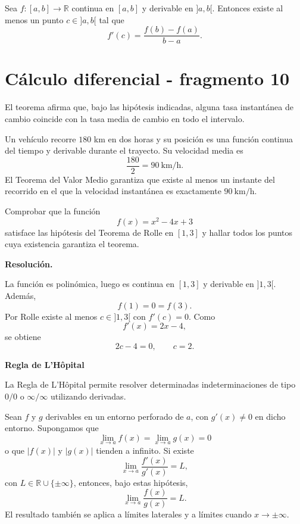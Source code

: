 \begin{theorem}
Sea $f:[a,b]\to\mathbb{R}$ continua en $[a,b]$ y derivable en $]a,b[$. Entonces existe al menos un punto $c\in]a,b[$ tal que
\[
f'(c)=\frac{f(b)-f(a)}{b-a}.
\]
\end{theorem}


\section{Cálculo diferencial - fragmento 10}
El teorema afirma que, bajo las hipótesis indicadas, alguna tasa instantánea de cambio coincide con la tasa media de cambio en todo el intervalo.

\begin{example}
Un vehículo recorre $180$ km en dos horas y su posición es una función continua del tiempo y derivable durante el trayecto. Su velocidad media es
\[
\frac{180}{2}=90\ \mathrm{km/h}.
\]
El Teorema del Valor Medio garantiza que existe al menos un instante del recorrido en el que la velocidad instantánea es exactamente $90\ \mathrm{km/h}$.
\end{example}

\begin{solvedexercise}
Comprobar que la función
\[
f(x)=x^2-4x+3
\]
satisface las hipótesis del Teorema de Rolle en $[1,3]$ y hallar todos los puntos cuya existencia garantiza el teorema.

\textbf{Resolución.}\par\smallskip
La función es polinómica, luego es continua en $[1,3]$ y derivable en $]1,3[$. Además,
\[
f(1)=0=f(3).
\]
Por Rolle existe al menos $c\in]1,3[$ con $f'(c)=0$. Como
\[
f'(x)=2x-4,
\]
se obtiene
\[
2c-4=0,
\qquad
\boxed{c=2}.
\]
\end{solvedexercise}

\textbf{Regla de L'Hôpital}

La Regla de L'Hôpital permite resolver determinadas indeterminaciones de tipo $0/0$ o $\infty/\infty$ utilizando derivadas.

\begin{theorem}
Sean $f$ y $g$ derivables en un entorno perforado de $a$, con $g'(x)\neq0$ en dicho entorno. Supongamos que
\[
\lim_{x\to a}f(x)=\lim_{x\to a}g(x)=0
\]
o que $|f(x)|$ y $|g(x)|$ tienden a infinito. Si existe
\[
\lim_{x\to a}\frac{f'(x)}{g'(x)}=L,
\]
con $L\in\mathbb{R}\cup\{\pm\infty\}$, entonces, bajo estas hipótesis,
\[
\lim_{x\to a}\frac{f(x)}{g(x)}=L.
\]
El resultado también se aplica a límites laterales y a límites cuando $x\to\pm\infty$.
\end{theorem}

